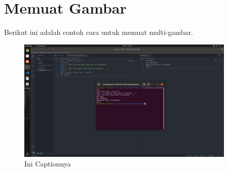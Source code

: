 \documentclass[11pt,a4paper]{article}
\begin{document}
\section{Memuat Gambar}
Berikut ini adalah contoh cara untuk memuat multi-gambar.
\begin{figure}[h]
    \centering
    \includegraphics[width=0.93\textwidth]{figure/task_8.png}
    \caption{Ini Captionnya}
    \label{fig:my_label}
\end{figure}

\newpage


\end{document}
